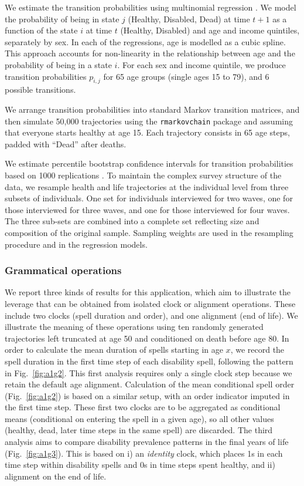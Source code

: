 \documentclass[a4paper,left=1.25cm,right=1.25cm,top=1.25cm,bottom=1.25cm]{article}
\begin{document}
We estimate the transition probabilities using multinomial regression \citep{Allison1982}. We model the probability of being in state $j$ (Healthy, Disabled, Dead) at time $t + 1$ as a function of the state $i$ at time $t$ (Healthy, Disabled) and age and income quintiles, separately by sex. In each of the regressions, age is modelled as a cubic spline. This approach accounts for non-linearity in the relationship between age and the probability of being in a state $i$. For each sex and income quintile, we produce transition probabilities $p_{i,j}$ for 65 age groups (single ages 15 to 79), and 6 possible transitions.

We arrange transition probabilities into standard Markov transition matrices, and then simulate 50,000 trajectories using the \texttt{rmarkovchain} package \citep{spedicato2017} and assuming that everyone starts healthy at age 15. Each trajectory consists in 65 age steps, padded with ``Dead'' after deaths. 

We estimate percentile bootstrap confidence intervals for transition probabilities based on 1000 replications \citep{Cameron2005}.
To maintain the complex survey structure of the data, we resample health and life trajectories at the individual level from three subsets of individuals. One set for individuals interviewed for two waves, one for those interviewed for three waves, and one for those interviewed for four waves. The three sub-sets are combined into a complete set reflecting size and composition of the original sample. Sampling weights are used in the resampling procedure and in the regression models.

\subsubsection{Grammatical operations}
We report three kinds of results for this application, which aim to illustrate the leverage that can be obtained from isolated clock or alignment operations. These include two clocks (spell duration and order), and one alignment (end of life). We illustrate the meaning of these operations using ten randomly generated trajectories left truncated at age 50 and conditioned on death before age 80. In order to calculate the mean duration of spells starting in age $x$, we record the spell duration in the first time step of each disability spell, following the pattern in Fig.~\ref{fig:a1g2}. This first analysis requires only a single clock step because we retain the default age alignment. Calculation of the mean conditional spell order (Fig.~\ref{fig:a1g2}) is based on a similar setup, with an order indicator imputed in the first time step. These first two clocks are to be aggregated as conditional means (conditional on entering the spell in a given age), so all other values (healthy, dead, later time steps in the same spell) are discarded. The third analysis aims to compare disability prevalence patterns in the final years of life (Fig.~\ref{fig:a1g3}). This is based on i) an \emph{identity} clock, which places 1s in each time step within disability spells and 0s in time steps spent healthy, and ii) alignment on the end of life.
\end{document}
